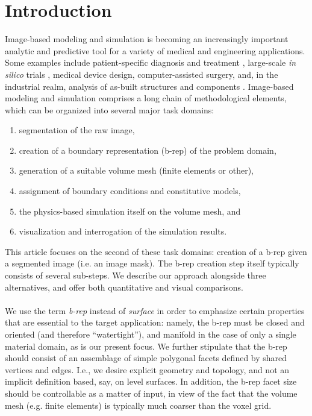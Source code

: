 \section{Introduction}

Image-based modeling and simulation is becoming an increasingly important analytic and predictive tool for a variety of medical and engineering applications. Some examples include patient-specific diagnosis and treatment \cite{neal2010current}, large-scale \textit{in silico} trials \cite{viceconti2016silico}, medical device design, computer-assisted surgery, and, in the industrial realm, analysis of as-built structures and components \cite{bradley2005advances}. Image-based modeling and simulation comprises a long chain of methodological elements, which can be organized into several major task domains: 
\vspace{3mm}
\begin{enumerate}
\item
segmentation of the raw image, 
\item
creation of a boundary representation (b-rep) of the problem domain,
\item
generation of a suitable volume mesh (finite elements or other), 
\item
assignment
of boundary conditions and constitutive models, 
\item
the physics-based
simulation itself on the volume mesh, and
\item
visualization and interrogation of the simulation results.
\end{enumerate}
\vspace{3mm}
This article focuses on the second of these task domains:  creation of a b-rep given a segmented image (i.e. an image mask).  
The b-rep creation step itself typically consists of several sub-steps.  
We describe our approach alongside three alternatives, and offer both quantitative and visual comparisons. \\ \\ %
We use the term {\em b-rep} instead of {\em surface}
in order to emphasize certain properties that are essential to the target
application:  namely, the b-rep must be closed and oriented (and therefore
``watertight''), and manifold in the case of only a single material domain, as is our present focus.  We further stipulate that the b-rep should consist of an assemblage of simple polygonal facets defined by shared vertices and 
edges.  I.e., we desire explicit geometry and topology, and not an implicit definition based, say, on level surfaces. In addition, the b-rep facet size should be controllable as a matter of input, in view of the fact that the volume mesh (e.g. finite elements) is typically much coarser than the voxel grid. \\ \\
